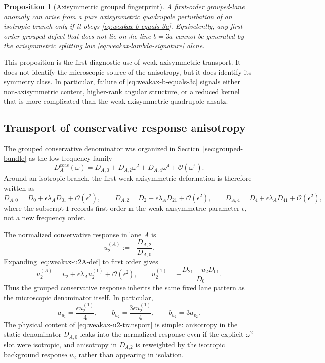 \documentclass[11pt]{article}
\newtheorem{proposition}[theorem]{Proposition}
\theoremstyle{definition}
\newcommand{\cO}{\mathcal O}
\begin{document}
\begin{proposition}[Axisymmetric grouped fingerprint]
A first-order grouped-lane anomaly can arise from a pure axisymmetric quadrupole perturbation of an isotropic branch only if it obeys \eqref{eq:weakax-b-equals-3a}. Equivalently, any first-order grouped defect that does not lie on the line $b=3a$ cannot be generated by the axisymmetric splitting law \eqref{eq:weakax-lambda-signature} alone.
\end{proposition}

This proposition is the first diagnostic use of weak-axisymmetric transport. It does not identify the microscopic source of the anisotropy, but it does identify its symmetry class. In particular, failure of \eqref{eq:weakax-b-equals-3a} signals either non-axisymmetric content, higher-rank angular structure, or a reduced kernel that is more complicated than the weak axisymmetric quadrupole ansatz.

\subsection{Transport of conservative response anisotropy}

The grouped conservative denominator was organized in Section~\ref{sec:grouped-bundle} as the low-frequency family
\[
D_A^{\mathrm{cons}}(\omega)=D_{A,0}+D_{A,2}\omega^2+D_{A,4}\omega^4+\cO(\omega^6).
\]
Around an isotropic branch, the first weak-axisymmetric deformation is therefore written as
\begin{equation}
 D_{A,0}=D_0+\epsilon\lambda_A D_{01}+\cO(\epsilon^2),
 \qquad
 D_{A,2}=D_2+\epsilon\lambda_A D_{21}+\cO(\epsilon^2),
 \qquad
 D_{A,4}=D_4+\epsilon\lambda_A D_{41}+\cO(\epsilon^2),
 \label{eq:weakax-D-expansion}
\end{equation}
where the subscript $1$ records first order in the weak-axisymmetric parameter $\epsilon$, not a new frequency order.

The normalized conservative response in lane $A$ is
\begin{equation}
 u_2^{(A)}:=-\frac{D_{A,2}}{D_{A,0}}.
 \label{eq:weakax-u2A-def}
\end{equation}
Expanding \eqref{eq:weakax-u2A-def} to first order gives
\begin{equation}
 u_2^{(A)}
 =
 u_2+\epsilon\lambda_A u_2^{(1)}+\cO(\epsilon^2),
 \qquad
 u_2^{(1)}=-\frac{D_{21}+u_2D_{01}}{D_0}.
 \label{eq:weakax-u2-transport}
\end{equation}
Thus the grouped conservative response inherits the same fixed lane pattern as the microscopic denominator itself. In particular,
\begin{equation}
 a_{u_2}=\frac{\epsilon u_2^{(1)}}{4},
 \qquad
 b_{u_2}=\frac{3\epsilon u_2^{(1)}}{4},
 \qquad
 b_{u_2}=3a_{u_2}.
 \label{eq:weakax-u2-anomalies}
\end{equation}
The physical content of \eqref{eq:weakax-u2-transport} is simple: anisotropy in the static denominator $D_{A,0}$ leaks into the normalized response even if the explicit $\omega^2$ slot were isotropic, and anisotropy in $D_{A,2}$ is reweighted by the isotropic background response $u_2$ rather than appearing in isolation.
\end{document}
